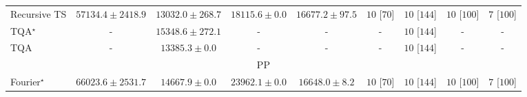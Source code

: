 \begin{tabular}{l|cccc|cccc|}
Recursive TS & {\cellcolor[HTML]{A63A03}} \color[HTML]{F1F1F1} $57134.4\pm 2418.9$ & {\cellcolor[HTML]{FFFCD4}} \color[HTML]{000000} $13032.0\pm 268.7$ & {\cellcolor[HTML]{FFF4B6}} \color[HTML]{000000} $18115.6\pm 0.0$ & {\cellcolor[HTML]{FFF8C0}} \color[HTML]{000000} $16677.2\pm 97.5$ & {\cellcolor[HTML]{49006A}} \color[HTML]{F1F1F1} $10$ [$70$] & {\cellcolor[HTML]{49006A}} \color[HTML]{F1F1F1} $10$ [$144$] & {\cellcolor[HTML]{49006A}} \color[HTML]{F1F1F1} $10$ [$100$] & {\cellcolor[HTML]{CD238F}} \color[HTML]{F1F1F1} $7$ [$100$] \\
TQA$^\star$ & {\cellcolor[HTML]{000000}} \color[HTML]{F1F1F1} {\cellcolor{white}} \color{black} - & {\cellcolor[HTML]{FFF9C7}} \color[HTML]{000000} $15348.6\pm 272.1$ & {\cellcolor[HTML]{000000}} \color[HTML]{F1F1F1} {\cellcolor{white}} \color{black} - & {\cellcolor[HTML]{000000}} \color[HTML]{F1F1F1} {\cellcolor{white}} \color{black} - & {\cellcolor[HTML]{000000}} \color[HTML]{F1F1F1} {\cellcolor{white}} \color{black} - & {\cellcolor[HTML]{49006A}} \color[HTML]{F1F1F1} $10$ [$144$] & {\cellcolor[HTML]{000000}} \color[HTML]{F1F1F1} {\cellcolor{white}} \color{black} - & {\cellcolor[HTML]{000000}} \color[HTML]{F1F1F1} {\cellcolor{white}} \color{black} - \\
TQA & {\cellcolor[HTML]{000000}} \color[HTML]{F1F1F1} {\cellcolor{white}} \color{black} - & {\cellcolor[HTML]{FFFBD3}} \color[HTML]{000000} $13385.3\pm 0.0$ & {\cellcolor[HTML]{000000}} \color[HTML]{F1F1F1} {\cellcolor{white}} \color{black} - & {\cellcolor[HTML]{000000}} \color[HTML]{F1F1F1} {\cellcolor{white}} \color{black} - & {\cellcolor[HTML]{000000}} \color[HTML]{F1F1F1} {\cellcolor{white}} \color{black} - & {\cellcolor[HTML]{49006A}} \color[HTML]{F1F1F1} $10$ [$144$] & {\cellcolor[HTML]{000000}} \color[HTML]{F1F1F1} {\cellcolor{white}} \color{black} - & {\cellcolor[HTML]{000000}} \color[HTML]{F1F1F1} {\cellcolor{white}} \color{black} - \\
\cline{1-9}
\multicolumn{9}{c}{\rule{0pt}{8pt}PP} \\
\midrule
Fourier$^\star$ & {\cellcolor[HTML]{004529}} \color[HTML]{F1F1F1} $66023.6\pm 2531.7$ & {\cellcolor[HTML]{FAFDC9}} \color[HTML]{000000} $14667.9\pm 0.0$ & {\cellcolor[HTML]{DAF0A4}} \color[HTML]{000000} $23962.1\pm 0.0$ & {\cellcolor[HTML]{F8FCBD}} \color[HTML]{000000} $16648.0\pm 8.2$ & {\cellcolor[HTML]{49006A}} \color[HTML]{F1F1F1} $10$ [$70$] & {\cellcolor[HTML]{49006A}} \color[HTML]{F1F1F1} $10$ [$144$] & {\cellcolor[HTML]{49006A}} \color[HTML]{F1F1F1} $10$ [$100$] & {\cellcolor[HTML]{CD238F}} \color[HTML]{F1F1F1} $7$ [$100$] \\

\end{tabular}
